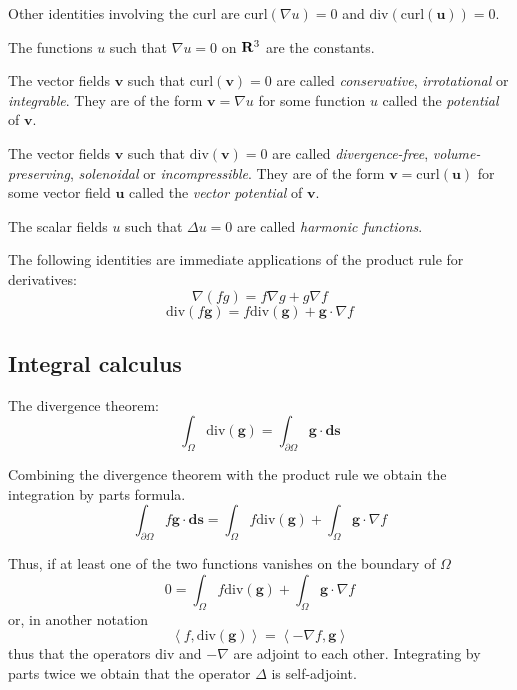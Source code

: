 Other identities involving the curl are
$\mathrm{curl}(\nabla u)=0$ and
$\mathrm{div}(\mathrm{curl}(\mathbf{u}))=0$.



The functions $u$ such that $\nabla u=0$ on $\mathbf{R}^3$ are the constants.



The vector fields $\mathbf{v}$ such that $\mathrm{curl}(\mathbf{v})=0$ are
called \emph{conservative}, \emph{irrotational} or \emph{integrable}.
They are of the form $\mathbf{v}=\nabla u$ for some function $u$ called the
\emph{potential} of $\mathbf{v}$.




The vector fields $\mathbf{v}$ such that $\mathrm{div}(\mathbf{v})=0$ are called
\emph{divergence-free}, \emph{volume-preserving}, \emph{solenoidal} or
\emph{incompressible}.
They are of the form $\mathbf{v}=\mathrm{curl}(\mathbf{u})$ for some vector
field $\mathbf{u}$ called the
\emph{vector potential} of $\mathbf{v}$.



The scalar fields $u$ such that $\Delta u=0$ are called
\emph{harmonic functions}.



The following identities are immediate applications of the product rule for
derivatives:
\[ \nabla(fg) = f\nabla g + g\nabla f \]
\[ \mathrm{div}(f\mathbf{g}) = f\mathrm{div}(\mathbf{g}) + \mathbf{g}\cdot\nabla f \]


\subsection{Integral calculus}


The divergence theorem:
\[
\int_\Omega \mathrm{div}(\mathbf{g}) =
\int_{\partial\Omega}\mathbf{g}\cdot\mathbf{ds}
\]



Combining the divergence theorem with the product rule we obtain the
integration by parts formula.
\[
\int_{\partial\Omega} f\mathbf{g}\cdot\mathbf{ds} =
\int_\Omega
f\mathrm{div}(\mathbf{g})
+
\int_\Omega
\mathbf{g}\cdot\nabla f
\]



Thus, if at least one of the two functions vanishes on the boundary of
$\Omega$
\[
0=
\int_\Omega
f\mathrm{div}(\mathbf{g})
+
\int_\Omega
\mathbf{g}\cdot\nabla f
\]
or, in another notation
\[
\left\langle
f, \mathrm{div}(\mathbf{g})
\right\rangle
=
\left\langle
-\nabla f, \mathbf{g}
\right\rangle
\]
thus that the operators $\mathrm{div}$ and $-\nabla$ are adjoint to each
other.  Integrating by parts twice we obtain that the operator $\Delta$ is
self-adjoint.


